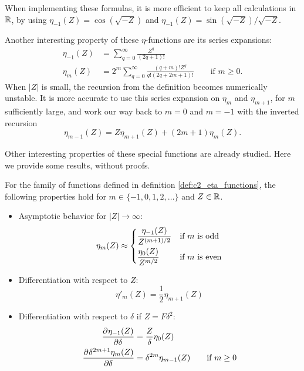 When implementing these formulas, it is more efficient to keep all calculations in $\mathbb{R}$, by using $\eta_{-1}(Z) = \cos(\sqrt{-Z})$ and $\eta_{-1}(Z) = \sin(\sqrt{-Z})/\sqrt{-Z}$.

Another interesting property of these $\eta$-functions are its series expansions:\begin{align*}
    \eta_{-1}(Z) & = \sum_{q=0}^{\infty} \frac{Z^q}{(2q + 1)!}                                                      \\
    \eta_{m}(Z)  & = 2^m \sum_{q=0}^{\infty} \frac{(q+m)! Z^q}{q!(2q + 2m + 1)!} \qquad \text{if } m \geq 0\text{.}
\end{align*}
When $|Z|$ is small, the recursion from the definition becomes numerically unstable. It is more accurate to use this series expansion on $\eta_m$ and $\eta_{m+1}$, for $m$ sufficiently large, and work our way back to $m=0$ and $m=-1$ with the inverted recursion
$$
    \eta_{m-1}(Z) = Z \eta_{m+1}(Z) + (2 m + 1) \eta_{m}(Z)
    \text{.}
$$

Other interesting properties of these special functions are already studied. Here we provide some results, without proofs.
\begin{theorem}[Ixaru 1984]
    For the family of functions defined in definition \ref{def:c2_eta_functions}, the following properties hold for $m \in \{-1, 0, 1, 2, \dots\}$ and $Z \in \mathbb{R}$.
    \begin{itemize}
        \item Asymptotic behavior for $|Z| \to \infty$:
              $$\eta_m(Z) \approx  \begin{dcases}
                      \frac{\eta_{-1}(Z)}{Z^{(m+1)/2}} & \text{if $m$ is odd}  \\
                      \frac{\eta_{0}(Z)}{Z^{m/2}}      & \text{if $m$ is even}
                  \end{dcases}$$
        \item Differentiation with respect to $Z$:
              $$
                  \eta'_{m}(Z) = \frac{1}{2}\eta_{m+1}(Z)
              $$
        \item Differentiation with respect to $\delta$ if $Z = F\delta^2$:
              \begin{align*}
                  \pdv[]{\eta_{-1}(Z)}{\delta}             & = \frac{Z}{\delta} \eta_0(Z)                           \\
                  \pdv[]{\delta^{2m+1}\eta_{m}(Z)}{\delta} & = \delta^{2m} \eta_{m-1}(Z) \qquad \text{if } m \geq 0 \\
              \end{align*}
    \end{itemize}
\end{theorem}

